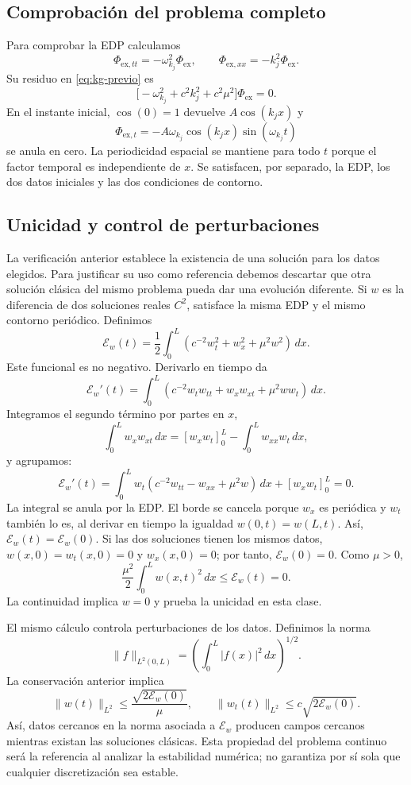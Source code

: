 \subsection{Comprobación del problema completo}
Para comprobar la EDP calculamos
\[
\Phi_{\mathrm{ex},tt}=-\omega_{k_j}^2\Phi_{\mathrm{ex}},
\qquad \Phi_{\mathrm{ex},xx}=-k_j^2\Phi_{\mathrm{ex}}.
\]
Su residuo en \eqref{eq:kg-previo} es
\[
\bigl[-\omega_{k_j}^2+c^2k_j^2+c^2\mu^2\bigr]\Phi_{\mathrm{ex}}=0.
\]
En el instante inicial, $\cos(0)=1$ devuelve $A\cos(k_jx)$ y
\[
\Phi_{\mathrm{ex},t}=-A\omega_{k_j}\cos(k_jx)\sin(\omega_{k_j}t)
\]
se anula en cero. La periodicidad espacial se mantiene para todo $t$
porque el factor temporal es independiente de $x$. Se satisfacen, por
separado, la EDP, los dos datos iniciales y las dos condiciones de contorno.

\subsection{Unicidad y control de perturbaciones}
La verificación anterior establece la existencia de una solución para los
datos elegidos. Para justificar su uso como referencia debemos descartar
que otra solución clásica del mismo problema pueda dar una evolución
diferente. Si $w$ es la diferencia de dos soluciones reales $C^2$,
satisface la misma EDP y el mismo contorno periódico. Definimos
\[
\mathcal E_w(t)=\frac12\int_0^L
\left(c^{-2}w_t^2+w_x^2+\mu^2w^2\right)\,dx.
\]
Este funcional es no negativo. Derivarlo en tiempo da
\[
\mathcal E_w'(t)=\int_0^L
\left(c^{-2}w_tw_{tt}+w_xw_{xt}+\mu^2ww_t\right)\,dx.
\]
Integramos el segundo término por partes en $x$,
\[
\int_0^L w_xw_{xt}\,dx=[w_xw_t]_0^L-\int_0^L w_{xx}w_t\,dx,
\]
y agrupamos:
\[
\mathcal E_w'(t)=
\int_0^L w_t\left(c^{-2}w_{tt}-w_{xx}+\mu^2w\right)\,dx
+[w_xw_t]_0^L=0.
\]
La integral se anula por la EDP. El borde se cancela porque $w_x$ es
periódica y $w_t$ también lo es, al derivar en tiempo la igualdad
$w(0,t)=w(L,t)$. Así, $\mathcal E_w(t)=\mathcal E_w(0)$.
Si las dos soluciones tienen los mismos datos, $w(x,0)=w_t(x,0)=0$ y
$w_x(x,0)=0$; por tanto, $\mathcal E_w(0)=0$. Como $\mu>0$,
\[
\frac{\mu^2}{2}\int_0^L w(x,t)^2\,dx\le\mathcal E_w(t)=0.
\]
La continuidad implica $w=0$ y prueba la unicidad en esta clase.

El mismo cálculo controla perturbaciones de los datos. Definimos la norma
\[
\|f\|_{L^2(0,L)}=\left(\int_0^L|f(x)|^2\,dx\right)^{1/2}.
\]
La conservación anterior implica
\[
\|w(t)\|_{L^2}\le\frac{\sqrt{2\mathcal E_w(0)}}\mu,
\qquad
\|w_t(t)\|_{L^2}\le c\sqrt{2\mathcal E_w(0)}.
\]
Así, datos cercanos en la norma asociada a $\mathcal E_w$ producen campos
cercanos mientras existan las soluciones clásicas. Esta propiedad del
problema continuo será la referencia al analizar la estabilidad numérica;
no garantiza por sí sola que cualquier discretización sea estable.

